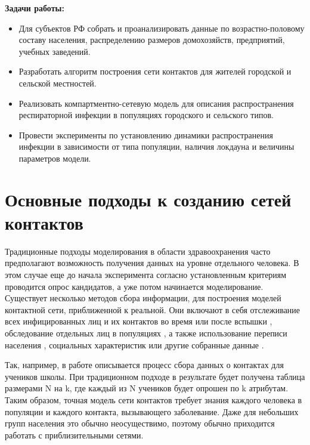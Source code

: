 \documentclass[14pt,a4paper]{article}
\begin{document}
\textbf{Задачи работы:}
\begin{itemize}
	\item Для субъектов РФ собрать и проанализировать данные по возрастно-половому составу населения, распределению размеров домохозяйств, предприятий, учебных заведений.
	
	\item  Разработать алгоритм построения сети контактов для жителей городской и сельской местностей.
	
	\item Реализовать компартментно-сетевую модель для описания распространения респираторной инфекции в популяциях городского и сельского типов.
	
	\item Провести эксперименты по установлению динамики распространения инфекции в зависимости от типа популяции, наличия локдауна и величины параметров модели.
	
\end{itemize}












\section{Основные подходы к созданию сетей контактов}

Традиционные подходы моделирования в области здравоохранения часто предполагают возможность получения данных на уровне отдельного человека. В этом случае еще до начала эксперимента согласно установленным критериям проводится опрос кандидатов, а уже потом начинается моделирование.
Существует несколько методов сбора информации, для построения моделей контактной сети, приближенной к реальной. Они включают в себя отслеживание всех инфицированных лиц и их контактов во время
или после вспышки \cite{Klovdahl}, обследование отдельных лиц в популяциях \cite{Eubank}, а также
использование переписи населения \cite{Meyers}, социальных характеристик \cite{Meyers} или другие собранные данные \cite{Meyers_2003}.

Так, например, в работе \cite{Luke} описывается процесс сбора данных о контактах для учеников школы. При традиционном подходе в результате будет получена таблица размерами N на k, где каждый из N учеников будет опрошен по k атрибутам. 
Таким образом, точная модель сети контактов требует знания каждого человека в
популяции и каждого контакта, вызывающего
заболевание. Даже для небольших
групп населения это обычно неосуществимо, поэтому обычно приходится работать с приблизительными сетями. 
\end{document}
